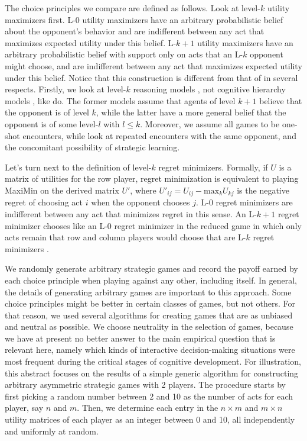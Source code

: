 \documentclass{llncs}
\begin{document}
The choice principles we compare are defined as follows. Look at
level-$k$ utility maximizers first. L-0 utility maximizers have an
arbitrary probabilistic belief about the opponent's behavior and are
indifferent between any act that maximizes expected utility under this
belief. L-$k+1$ utility maximizers have an arbitrary probabilistic
belief with support only on acts that an L-$k$ opponent might choose,
and are indifferent between any act that maximizes expected utility
under this belief. Notice that this construction is different from
that of \citet{Weerdde-WeerdVerbrugge2013:How-much-does-i} in several
respects. Firstly, we look at level-$k$ reasoning models
\citep[e.g.][]{Crawford2003:Lying-for-Strat,Crawford2007:Lets-Talk-It-Ove},
not cognitive hierarchy models
\citep[e.g.][]{CamererHo2004:A-Cognitive-Hie}, like
\citeauthor{Weerdde-WeerdVerbrugge2013:How-much-does-i} do. The former
models assume that agents of level $k+1$ believe that the opponent is
of level $k$, while the latter have a more general belief that the
opponent is of some level-$l$ with $l \le k$. Moreover, we assume all
games to be one-shot encounters, while
\citeauthor{Weerdde-WeerdVerbrugge2013:How-much-does-i} look at
repeated encounters with the same opponent, and the concomitant
possibility of strategic learning.


Let's turn next to the definition of level-$k$ regret
minimizers. Formally, if $U$ is a matrix of utilities for the row
player, regret minimization is equivalent to playing MaxiMin on the
derived matrix $U'$, where $U'_{ij} = U_{ij} - \textrm{max}_{k}
U_{kj}$ is the negative regret of choosing act $i$ when the opponent
chooses $j$. L-0 regret minimizers are indifferent between any act
that minimizes regret in this sense. An L-$k+1$ regret minimizer
chooses like an L-0 regret minimizer in the reduced game in which only
acts remain that row and column players would choose that are L-$k$
regret minimizers \citep[see][]{HalpernPass2012:Iterated-Regret}.

We randomly generate arbitrary strategic games and record the payoff
earned by each choice principle when playing against any other,
including itself. In general, the details of generating arbitrary
games are important to this approach. Some choice principles might be
better in certain classes of games, but not others. For that reason,
we used several algorithms for creating games that are as unbiased and
neutral as possible. We choose neutrality in the selection of games,
because we have at present no better answer to the main empirical
question that is relevant here, namely which kinds of interactive
decision-making situations were most frequent during the critical
stages of cognitive development. For illustration, this abstract
focuses on the results of a simple generic algorithm for constructing
arbitrary asymmetric strategic games with 2 players. The procedure
starts by first picking a random number between 2 and 10 as the number
of acts for each player, say $n$ and $m$. Then, we determine each
entry in the $n \times m$ and $m \times n$ utility matrices of each
player as an integer between 0 and 10, all independently and uniformly
at random.
\end{document}
